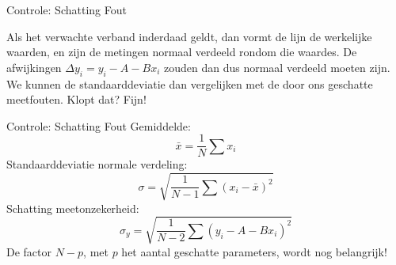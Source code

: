 \documentclass{beamer}
\begin{document}
\begin{frame}{Controle: Schatting Fout}
  \begin{center}
  \end{center}
  Als het verwachte verband inderdaad geldt, dan vormt de lijn de \alert{werkelijke waarden}, en zijn de metingen normaal verdeeld rondom die waardes. De afwijkingen $\Delta y_i = y_i - A - Bx_i$ zouden dan dus normaal verdeeld moeten zijn. We kunnen de standaarddeviatie dan vergelijken met de door ons geschatte meetfouten. Klopt dat? Fijn!
\end{frame}

\begin{frame}{Controle: Schatting Fout}
  Gemiddelde:
  \begin{equation*}
    \bar x = \frac{1}{N}\sum x_i  \tag{0 parameters}
  \end{equation*}
  Standaarddeviatie normale verdeling:
  \begin{equation*}
    \sigma = \sqrt{\frac{1}{N-1}\sum(x_i - \bar x)^2} \tag{1 parameter}
  \end{equation*}
  Schatting meetonzekerheid:
  \begin{equation*}
    \sigma_y = \sqrt{\frac{1}{N-2}\sum(y_i - A - Bx_i)^2} \tag{2 parameters}
  \end{equation*}
  \pause
  De factor $N - p$, met $p$ het aantal geschatte parameters, wordt nog belangrijk!
\end{frame}
\end{document}
